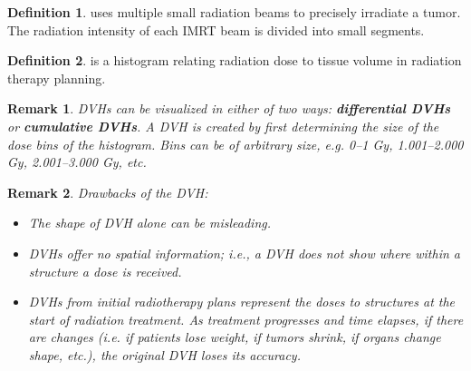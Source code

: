 \documentclass[a4paper]{article}
\theoremstyle{definition}
\newtheorem{definition}{Definition}
\theoremstyle{plain}
\newtheorem{remark}{Remark}
\begin{document}
\begin{definition}
 uses multiple small radiation beams to precisely irradiate a tumor. The radiation intensity of each IMRT beam is divided into small segments.
\end{definition}

\begin{definition}
 is a histogram relating radiation dose to tissue volume in radiation therapy planning.
\end{definition}

\begin{remark}
DVHs can be visualized in either of two ways: \textbf{differential DVHs} or \textbf{cumulative DVHs}. A DVH is created by first determining the size of the dose bins of the histogram. Bins can be of arbitrary size, e.g. 0–1 Gy, 1.001–2.000 Gy, 2.001–3.000 Gy, etc.
\end{remark}

\begin{remark}
Drawbacks of the DVH:
\begin{itemize}
    \item The shape of DVH alone can be misleading.
    \item DVHs offer no spatial information; i.e., a DVH does not show where within a structure a dose is received.
    \item DVHs from initial radiotherapy plans represent the doses to structures at the start of radiation treatment. As treatment progresses and time elapses, if there are changes (i.e. if patients lose weight, if tumors shrink, if organs change shape, etc.), the original DVH loses its accuracy.
\end{itemize}
\end{remark}
\end{document}

